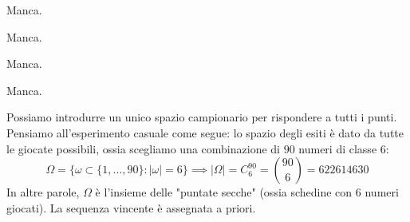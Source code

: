 \Soluzione

Manca.

\Soluzione

Manca.

\Soluzione

Manca.

\Soluzione

Manca.

\Soluzione

Possiamo introdurre un unico spazio campionario per rispondere a tutti i punti. Pensiamo all'esperimento casuale come segue: lo spazio degli esiti è dato da tutte le giocate possibili, ossia scegliamo una combinazione di $90$ numeri di classe $6$:
\[
	\Omega =\{\omega \subset \{1,\dots,90\} :| \omega | =6\} \implies | \Omega | =C_{6}^{90} =\binom{90}{6} =622614630
\]
In altre parole, $\Omega $ è l'insieme delle "puntate secche" (ossia schedine con $6$ numeri giocati). La sequenza vincente è assegnata a priori.
